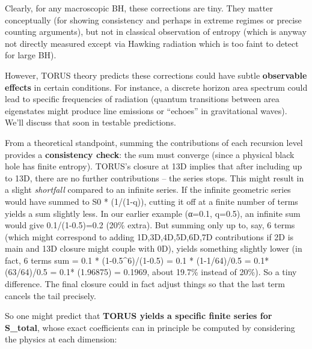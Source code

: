 \documentclass[]{article}
\begin{document}
Clearly, for any macroscopic BH, these corrections are tiny. They matter
conceptually (for showing consistency and perhaps in extreme regimes or
precise counting arguments), but not in classical observation of entropy
(which is anyway not directly measured except via Hawking radiation
which is too faint to detect for large BH).

However, TORUS theory predicts these corrections could have subtle
\textbf{observable effects} in certain conditions. For instance, a
discrete horizon area spectrum could lead to specific frequencies of
radiation (quantum transitions between area eigenstates might produce
line emissions or ``echoes'' in gravitational waves). We'll discuss that
soon in testable predictions.

From a theoretical standpoint, summing the contributions of each
recursion level provides a \textbf{consistency check}: the sum must
converge (since a physical black hole has finite entropy). TORUS's
closure at 13D implies that after including up to 13D, there are no
further contributions -- the series stops. This might result in a slight
\emph{shortfall} compared to an infinite series. If the infinite
geometric series would have summed to S0 * (1/(1-q)), cutting it off at
a finite number of terms yields a sum slightly less. In our earlier
example (α=0.1, q=0.5), an infinite sum would give 0.1/(1-0.5)=0.2 (20\%
extra). But summing only up to, say, 6 terms (which might correspond to
adding 1D,3D,4D,5D,6D,7D contributions if 2D is main and 13D closure
might couple with 0D), yields something slightly lower (in fact, 6 terms
sum = 0.1 * (1-0.5\^{}6)/(1-0.5) = 0.1 * (1-1/64)/0.5 = 0.1*(63/64)/0.5
= 0.1* (1.96875) = 0.1969, about 19.7\% instead of 20\%). So a tiny
difference. The final closure could in fact adjust things so that the
last term cancels the tail precisely.

So one might predict that \textbf{TORUS yields a specific finite series
for S\_total}, whose exact coefficients can in principle be computed by
considering the physics at each dimension:
\end{document}
